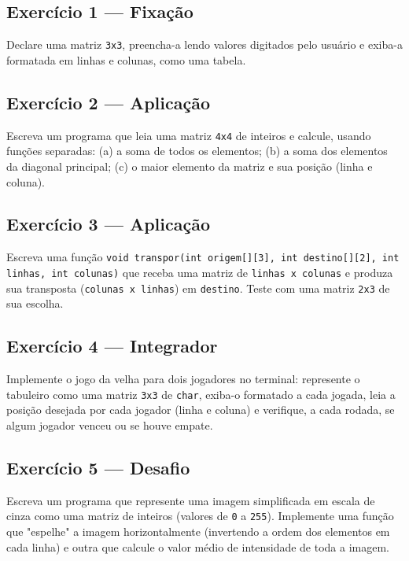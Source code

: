 \documentclass[12pt,a4paper,oneside]{extreport}
\begin{document}
\begin{exercicio}

\subsection*{Exercício 1 --- Fixação}
Declare uma matriz \texttt{3x3}, preencha-a lendo valores digitados pelo usuário e exiba-a formatada em linhas e colunas, como uma tabela.

\subsection*{Exercício 2 --- Aplicação}
Escreva um programa que leia uma matriz \texttt{4x4} de inteiros e calcule, usando funções separadas: (a) a soma de todos os elementos; (b) a soma dos elementos da diagonal principal; (c) o maior elemento da matriz e sua posição (linha e coluna).

\subsection*{Exercício 3 --- Aplicação}
Escreva uma função \texttt{void transpor(int origem[][3], int destino[][2], int linhas, int colunas)} que receba uma matriz de \texttt{linhas x colunas} e produza sua transposta (\texttt{colunas x linhas}) em \texttt{destino}. Teste com uma matriz \texttt{2x3} de sua escolha.

\subsection*{Exercício 4 --- Integrador}
Implemente o jogo da velha para dois jogadores no terminal: represente o tabuleiro como uma matriz \texttt{3x3} de \texttt{char}, exiba-o formatado a cada jogada, leia a posição desejada por cada jogador (linha e coluna) e verifique, a cada rodada, se algum jogador venceu ou se houve empate.

\subsection*{Exercício 5 --- Desafio}
Escreva um programa que represente uma imagem simplificada em escala de cinza como uma matriz de inteiros (valores de \texttt{0} a \texttt{255}). Implemente uma função que "espelhe" a imagem horizontalmente (invertendo a ordem dos elementos em cada linha) e outra que calcule o valor médio de intensidade de toda a imagem.

\end{exercicio}
\end{document}

